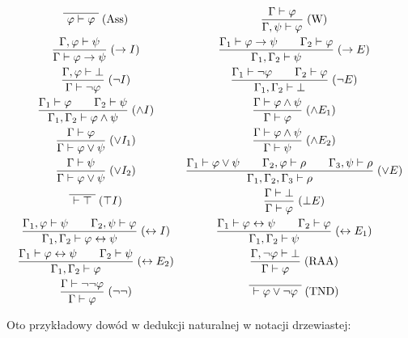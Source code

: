 \documentclass[shortabstract]{iithesis}
\theoremstyle{definition}
\theoremstyle{remark}
\theoremstyle{plain}
\begin{document}
\begin{center}
\[
\begin{array}{c c}
\displaystyle
\overline{\ \varphi \vdash \varphi\ }\;(\mathrm{Ass})
&
\displaystyle
\frac{\Gamma \vdash \varphi}{\Gamma,\psi \vdash \varphi}\;(\mathrm{W})
\\[2.2ex]
\displaystyle
\frac{\Gamma,\varphi \vdash \psi}{\Gamma \vdash \varphi \to \psi}\;(\to I)
&
\displaystyle
\frac{\Gamma_1 \vdash \varphi \to \psi \qquad \Gamma_2 \vdash \varphi}
     {\Gamma_1,\Gamma_2 \vdash \psi}\;(\to E)
\\[2.2ex]
\displaystyle
\frac{\Gamma,\varphi \vdash \bot}{\Gamma \vdash \neg\varphi}\;(\neg I)
&
\displaystyle
\frac{\Gamma_1 \vdash \neg\varphi \qquad \Gamma_2 \vdash \varphi}
     {\Gamma_1,\Gamma_2 \vdash \bot}\;(\neg E)
\\[2.2ex]
\displaystyle
\frac{\Gamma_1 \vdash \varphi \qquad \Gamma_2 \vdash \psi}
     {\Gamma_1,\Gamma_2 \vdash \varphi \wedge \psi}\;(\wedge I)
&
\displaystyle
\frac{\Gamma \vdash \varphi \wedge \psi}{\Gamma \vdash \varphi}\;(\wedge E_1)
\\[2.2ex]
\displaystyle
\frac{\Gamma \vdash \varphi}{\Gamma \vdash \varphi \vee \psi}\;(\vee I_1)
&
\displaystyle
\frac{\Gamma \vdash \varphi \wedge \psi}{\Gamma \vdash \psi}\;(\wedge E_2)
\\[2.2ex]
\displaystyle
\frac{\Gamma \vdash \psi}{\Gamma \vdash \varphi \vee \psi}\;(\vee I_2)
&
\displaystyle
\frac{\Gamma_1 \vdash \varphi \vee \psi \qquad \Gamma_2,\varphi \vdash \rho \qquad \Gamma_3,\psi \vdash \rho}
     {\Gamma_1,\Gamma_2,\Gamma_3 \vdash \rho}\;(\vee E)
\\[2.2ex]
\displaystyle
\overline{\ \vdash \top\ }\;(\top I)
&
\displaystyle
\frac{\Gamma \vdash \bot}{\Gamma \vdash \varphi}\;(\bot E)
\\[2.2ex]
\displaystyle
\frac{\Gamma_1,\varphi \vdash \psi \qquad \Gamma_2,\psi \vdash \varphi}
     {\Gamma_1,\Gamma_2 \vdash \varphi \leftrightarrow \psi}\;(\leftrightarrow I)
&
\displaystyle
\frac{\Gamma_1 \vdash \varphi \leftrightarrow \psi \qquad \Gamma_2 \vdash \varphi}
     {\Gamma_1,\Gamma_2 \vdash \psi}\;(\leftrightarrow E_1)
\\[2.2ex]
\displaystyle
\frac{\Gamma_1 \vdash \varphi \leftrightarrow \psi \qquad \Gamma_2 \vdash \psi}
     {\Gamma_1,\Gamma_2 \vdash \varphi}\;(\leftrightarrow E_2)
&
\displaystyle
\frac{\Gamma,\neg\varphi \vdash \bot}{\Gamma \vdash \varphi}\;(\mathrm{RAA})
\\[2.2ex]
\displaystyle
\frac{\Gamma \vdash \neg\neg\varphi}{\Gamma \vdash \varphi}\;(\neg\neg)
&
\displaystyle
\overline{\ \vdash \varphi \vee \neg\varphi\ }\;(\mathrm{TND})

\end{array}
\]
\label{tab:rules}



\end{center}
Oto przykładowy dowód w dedukcji naturalnej w notacji drzewiastej:
\end{document}
